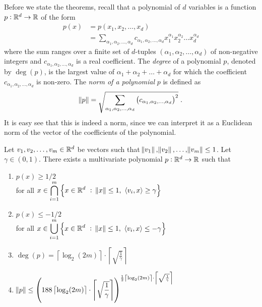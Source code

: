 Before we state the theorems, recall that a polynomial of $d$ variables is a
function $p:\mathbb{R}^d \to \mathbb{R}$ of the form
\begin{align*}
p(x)
& = p(x_1, x_2, \dots, x_d) \\
& = \sum_{\alpha_1, \alpha_2, \dots, \alpha_d} c_{\alpha_1, \alpha_2, \dots, \alpha_d} x_1^{\alpha_1} x_2^{\alpha_2} \dots x_d^{\alpha_d}
\end{align*}
where the sum ranges over a finite set of $d$-tuples $(\alpha_1, \alpha_2,
\dots, \alpha_d)$ of non-negative integers and $c_{\alpha_1, \alpha_2, \dots,
\alpha_d}$ is a real coefficient. The \emph{degree} of a polynomial $p$, denoted
by $\deg(p)$, is the largest value of $\alpha_1 + \alpha_2 + \dots + \alpha_d$
for which the coefficient $c_{\alpha_1, \alpha_2, \dots, \alpha_d}$ is non-zero.
The \emph{norm of a polynomial} $p$ is defined as
$$
\norm{p} = \sqrt{\sum_{\alpha_1, \alpha_2, \dots, \alpha_d} \left(c_{\alpha_1, \alpha_2, \dots, \alpha_d} \right)^2 } \; .
$$
It is easy see that this is indeed a norm, since we can interpret it as a
Euclidean norm of the vector of the coefficients of the polynomial.

\begin{theorem}
\label{theorem:polynomial-approximation-1}
Let $v_1, v_2, \dots, v_m \in \mathbb{R}^d$ be vectors such that $\norm{v_1},
\norm{v_2}, \dots, \norm{v_m} \le 1$. Let $\gamma \in (0,1)$. There exists a
multivariate polynomial $p:\mathbb{R}^d \to \mathbb{R}$ such that
\begin{enumerate}
\item $p(x) \ge 1/2$ \\ for all $\displaystyle x \in \bigcap_{i=1}^m \left\{ x \in \mathbb{R}^d ~:~ \norm{x} \le 1, \ \left\langle v_i, x \right\rangle \ge \gamma \right\}$
\item $p(x) \le -1/2$ \\ for all $\displaystyle x \in \bigcup_{i=1}^m \left\{ x \in \mathbb{R}^d ~:~ \norm{x} \le 1, \ \left\langle v_i, x \right\rangle \le - \gamma \right\}$
\item $\displaystyle \deg(p) = \left\lceil \log_2(2m) \right\rceil \cdot \left\lceil \sqrt{\frac{1}{\gamma}} \right\rceil$
\item $\displaystyle \norm{p} \le \left( 188 \left\lceil \log_2(2m) \right\rceil \cdot \left\lceil \sqrt{\frac{1}{\gamma}} \right\rceil \right)^{\frac{1}{2} \left\lceil \log_2(2m) \right\rceil \cdot \left\lceil \sqrt{\frac{1}{\gamma}} \right\rceil}$
\end{enumerate}
\end{theorem}

